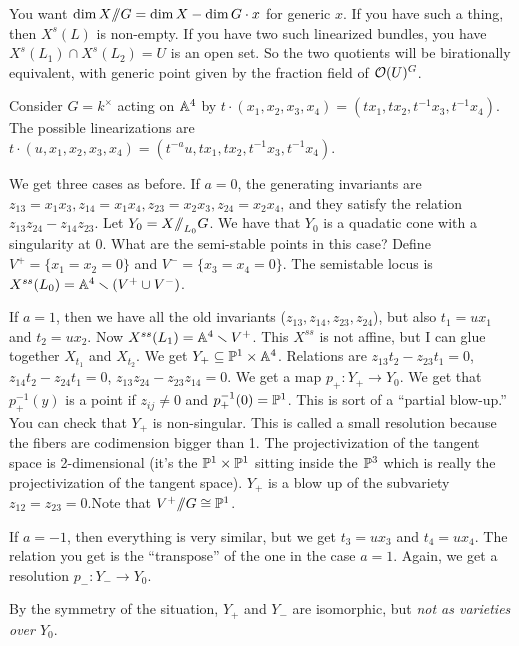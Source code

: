 You want $\dim X\quot G = \dim X-\dim G\cdot x$ for generic $x$. If you have such a thing, then $X^{s}(L)$ is non-empty. If you have two such linearized bundles, you have $X^s(L_1)\cap X^s(L_2)=U$ is an open set. So the two quotients will be birationally equivalent, with generic point given by the fraction field of $\O(U)^G$.
\begin{example}
 Consider $G=k^\times$ acting on $\AA^4$ by $t\cdot (x_1,x_2,x_3,x_4)=(tx_1,tx_2,t^{-1}x_3,t^{-1}x_4)$. The possible linearizations are $t\cdot (u,x_1,x_2,x_3,x_4)=(t^{-a}u,tx_1,tx_2,t^{-1}x_3,t^{-1}x_4)$.
 
 We get three cases as before. If $a=0$, the generating invariants are $z_{13}=x_1x_3,z_{14}=x_1x_4,z_{23}=x_2x_3,z_{24}=x_2x_4$, and they satisfy the relation $z_{13}z_{24}-z_{14}z_{23}$. Let $Y_0=X\quot_{L_0}G$. We have that $Y_0$ is a quadatic cone with a singularity at 0. What are the semi-stable points in this case? Define $V^+=\{x_1=x_2=0\}$ and $V^-=\{x_3=x_4=0\}$. The semistable locus is $X^{ss}(L_0)=\AA^4\setminus (V^+\cup V^-)$.
 
 If $a=1$, then we have all the old invariants ($z_{13},z_{14},z_{23},z_{24}$), but also $t_1=ux_1$ and $t_2=ux_2$. Now $X^{ss}(L_1)=\AA^4\setminus V^+$. This $X^{ss}$ is not affine, but I can glue together $X_{t_1}$ and $X_{t_2}$. We get $Y_+\subseteq \PP^1\times \AA^4$. Relations are $z_{13}t_2-z_{23}t_1=0$, $z_{14}t_2-z_{24}t_1=0$, $z_{13}z_{24}-z_{23}z_{14}=0$. We get a map $p_+\colon Y_+\to Y_0$. We get that $p_+^{-1}(y)$ is a point if $z_{ij}\neq 0$ and $p_+^{-1}(0)=\PP^1$. This is sort of a ``partial blow-up.''  You can check that $Y_+$ is non-singular. This is called a small resolution because the fibers are codimension bigger than 1. The projectivization of the tangent space is 2-dimensional (it's the $\PP^1\times \PP^1$ sitting inside the $\PP^3$ which is really the projectivization of the tangent space). $Y_+$ is a blow up of the subvariety $z_{12}=z_{23}=0$.Note that $V^+\quot G\cong \PP^1$.
 
 If $a=-1$, then everything is very similar, but we get $t_3=ux_3$ and $t_4=ux_4$. The relation you get is the ``transpose'' of the one in the case $a=1$. Again, we get a resolution $p_-\colon Y_-\to Y_0$.
 
 By the symmetry of the situation, $Y_+$ and $Y_-$ are isomorphic, but \emph{not as varieties over $Y_0$}.
\end{example}

